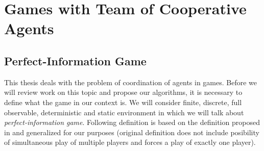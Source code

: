 \chapter{Games with Team of Cooperative Agents}
\label{chap_mas}





\section{Perfect-Information Game}


\label{sec_perfect_information_game}



This thesis deals with the problem of coordination of agents in games. Before we will review
work on this topic and propose our algorithms, it is necessary to define what the game in our
context is. We will consider finite, discrete, full observable, deterministic and static
environment in which we will talk about \emph{perfect-information game}. Following definition
is based on the definition
proposed in \cite{MAS2008} and generalized for our purposes (original definition does not
include posibility of simultaneous play of multiple players and forces a play of exactly one
player).


